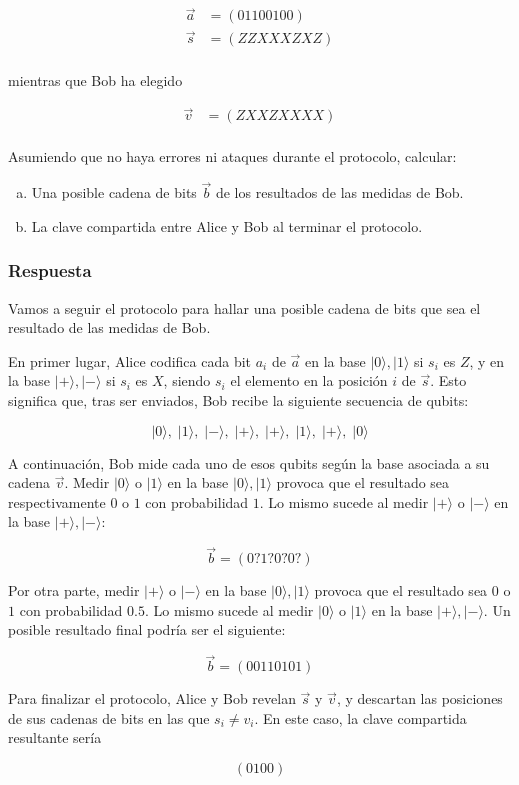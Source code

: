 \documentclass{article}
\begin{document}
\begin{align*}
  \vec{a} &= (01100100) \\ 
  \vec{s} &= (ZZXXXZXZ) \\
\end{align*}

mientras que Bob ha elegido 

\begin{align*}
  \vec{v} &= (ZXXZXXXX) \\
\end{align*}

Asumiendo que no haya errores ni ataques durante el protocolo,
calcular:

\begin{enumerate}[a)]
  \item Una posible cadena de bits $\vec{b}$ de los resultados de
    las medidas de Bob.
  \item La clave compartida entre Alice y Bob al terminar el
    protocolo.
\end{enumerate}

\subsubsection*{Respuesta}

Vamos a seguir el protocolo para hallar una posible cadena de bits
que sea el resultado de las medidas de Bob.

En primer lugar, Alice codifica cada bit $a_i$ de $\vec{a}$ en la
base $|0\rangle, |1\rangle$ si $s_i$ es $Z$, y en la base
$|+\rangle, |-\rangle$ si $s_i$ es $X$, siendo $s_i$ el elemento en
la posición $i$ de $\vec{s}$. Esto significa que, tras ser enviados,
Bob recibe la siguiente secuencia de qubits:

$$
|0\rangle,\;|1\rangle,\;|-\rangle,\;|+\rangle,\;
|+\rangle,\;|1\rangle,\;|+\rangle,\;|0\rangle
$$

A continuación, Bob mide cada uno de esos qubits según la base
asociada a su cadena $\vec{v}$. Medir $|0\rangle$ o $|1\rangle$ en
la base $|0\rangle, |1\rangle$ provoca que el resultado sea
respectivamente $0$ o $1$ con probabilidad $1$. Lo mismo sucede al
medir $|+\rangle$ o $|-\rangle$ en la base $|+\rangle, |-\rangle$:

$$
\vec{b} = (0?1?0?0?)
$$

Por otra parte, medir $|+\rangle$ o $|-\rangle$ en la base
$|0\rangle, |1\rangle$ provoca que el resultado sea $0$ o $1$ con
probabilidad $0.5$. Lo mismo sucede al medir $|0\rangle$
o $|1\rangle$ en la base $|+\rangle, |-\rangle$. Un posible
resultado final podría ser el siguiente:

$$
\vec{b} = (00110101)
$$

Para finalizar el protocolo, Alice y Bob revelan $\vec{s}$
y $\vec{v}$, y descartan las posiciones de sus cadenas de bits en
las que $s_i \neq v_i$. En este caso, la clave compartida resultante
sería

$$
(0100)
$$
\end{document}
